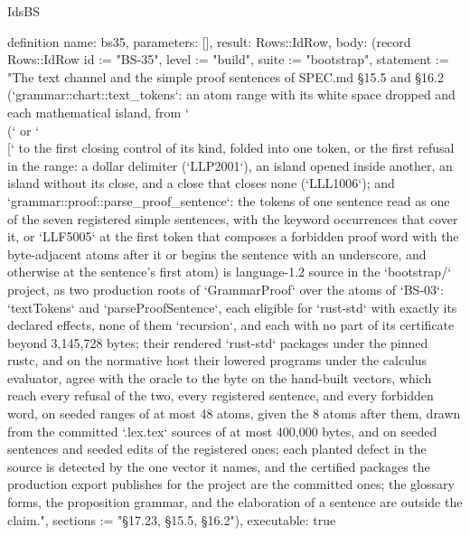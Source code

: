 \begin{lexlean}{IdsBS}
\begin{semanticmodule}
definition{
  name: bs35,
  parameters: [],
  result: Rows::IdRow,
  body: (record Rows::IdRow {id := "BS-35", level := "build", suite := "bootstrap", statement := "The text channel and the simple proof sentences of SPEC.md §15.5 and §16.2 (`grammar::chart::text_tokens`: an atom range with its white space dropped and each mathematical island, from `\\(` or `\\[` to the first closing control of its kind, folded into one token, or the first refusal in the range: a dollar delimiter (`LLP2001`), an island opened inside another, an island without its close, and a close that closes none (`LLL1006`); and `grammar::proof::parse_proof_sentence`: the tokens of one sentence read as one of the seven registered simple sentences, with the keyword occurrences that cover it, or `LLF5005` at the first token that composes a forbidden proof word with the byte-adjacent atoms after it or begins the sentence with an underscore, and otherwise at the sentence's first atom) is language-1.2 source in the `bootstrap/` project, as two production roots of `GrammarProof` over the atoms of `BS-03`: `textTokens` and `parseProofSentence`, each eligible for `rust-std` with exactly its declared effects, none of them `recursion`, and each with no part of its certificate beyond 3,145,728 bytes; their rendered `rust-std` packages under the pinned rustc, and on the normative host their lowered programs under the calculus evaluator, agree with the oracle to the byte on the hand-built vectors, which reach every refusal of the two, every registered sentence, and every forbidden word, on seeded ranges of at most 48 atoms, given the 8 atoms after them, drawn from the committed `.lex.tex` sources of at most 400,000 bytes, and on seeded sentences and seeded edits of the registered ones; each planted defect in the source is detected by the one vector it names, and the certified packages the production export publishes for the project are the committed ones; the glossary forms, the proposition grammar, and the elaboration of a sentence are outside the claim.", sections := "§17.23, §15.5, §16.2"}),
  executable: true
}


\end{semanticmodule}
\end{lexlean}

